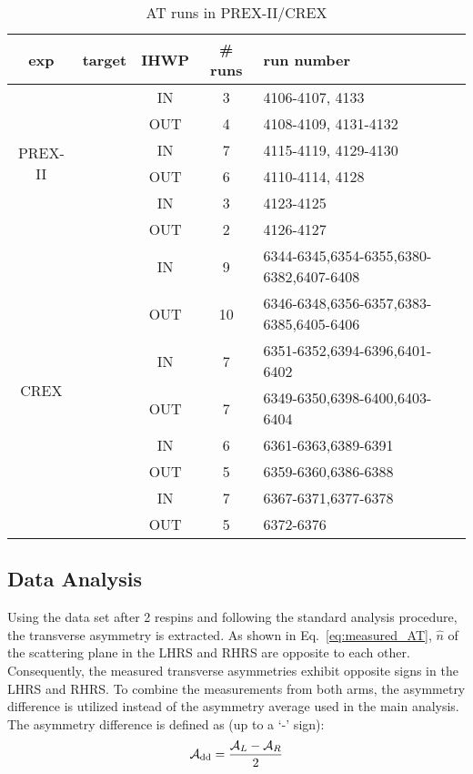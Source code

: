 \begin{table}[!h]
    \centering
    \begin{tabular}{c | c | c | c | l}
	\hline
	exp & target	& IHWP	& \# runs    & run number    \\
	\hline
	\multirow{6}{*}{PREX-II}    & \multirow{2}{*}{\Carbon}   & IN    & 3	& 4106-4107, 4133    \\
	    &   & OUT   & 4 & 4108-4109, 4131-4132   \\
	    \cline{2-5}
	    & \multirow{2}{*}{\Pb}  & IN    & 7	& 4115-4119, 4129-4130  \\
	    &	& OUT	& 6 & 4110-4114, 4128   \\
	    \cline{2-5}
	    & \multirow{2}{*}{\ca}  & IN    & 3	& 4123-4125	\\
	    &	& OUT	& 2 & 4126-4127 \\
	\hline
	\multirow{8}{*}{CREX}	& \multirow{2}{*}{\Ca}	& IN	& 9 & 6344-6345,6354-6355,6380-6382,6407-6408\\
	    &	& OUT	& 10	& 6346-6348,6356-6357,6383-6385,6405-6406   \\
	    \cline{2-5}
	    & \multirow{2}{*}{\ca}	& IN	& 7 & 6351-6352,6394-6396,6401-6402	\\
	    &	& OUT	& 7 & 6349-6350,6398-6400,6403-6404	\\
	    \cline{2-5}
	    & \multirow{2}{*}{\Carbon}	& IN	& 6 & 6361-6363,6389-6391	\\
	    &	& OUT	& 5 & 6359-6360,6386-6388	\\
	    \cline{2-5}
	    & \multirow{2}{*}{\Pb}	& IN	& 7 & 6367-6371,6377-6378	\\
	    &	& OUT	& 5 & 6372-6376 \\
	\hline
    \end{tabular}
    \caption{AT runs in PREX-II/CREX}
\end{table}

\subsection{Data Analysis}
Using the data set after 2 respins and following the standard analysis procedure, 
the transverse asymmetry is extracted. As shown in Eq.~\ref{eq:measured_AT},
$\hat{n}$ of the scattering plane in the LHRS and RHRS are opposite to each other.
Consequently, the measured transverse asymmetries exhibit opposite signs in the LHRS 
and RHRS. To combine the measurements from both arms, the asymmetry difference is
utilized instead of the asymmetry average used in the main analysis. 
The asymmetry difference is defined as (up to a `-' sign):
\begin{equation}
    \mathcal{A}_{\text{dd}} = \frac{\mathcal{A}_L - \mathcal{A}_R}{2}
\end{equation}


